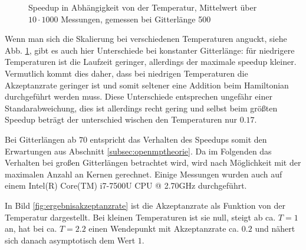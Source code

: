 	
	\begin{figure}[htbp]
		
		\caption[Speedup in Abhängigkeit von der Temperatur]{Speedup in Abhängigkeit von der Temperatur, Mittelwert über $10 \cdot 1000$ Messungen, gemessen bei Gitterlänge 500}
		\label{fig:skalierungtemp}
	\end{figure}
		
	Wenn man sich die Skalierung bei verschiedenen Temperaturen anguckt, siehe Abb. \ref{fig:skalierungtemp}, gibt es auch hier Unterschiede bei konstanter Gitterlänge: für niedrigere Temperaturen ist die Laufzeit geringer, allerdings der maximale speedup kleiner. Vermutlich kommt dies daher, dass bei niedrigen Temperaturen die Akzeptanzrate geringer ist und somit seltener eine Addition beim Hamiltonian durchgeführt werden muss. Diese Unterschiede entsprechen ungefähr einer Standarabweichung, dies ist allerdings recht gering und selbst beim größten Speedup beträgt der unterschied wischen den Temperaturen nur $\num{0,17}$.
	
	Bei Gitterlängen ab $70$ entspricht das Verhalten des Speedups somit den Erwartungen aus Abschnitt \ref{subsec:openmptheorie}. Da im Folgenden das Verhalten bei großen Gitterlängen betrachtet wird, wird nach Möglichkeit mit der maximalen Anzahl an Kernen gerechnet. Einige Messungen wurden auch auf einem Intel(R) Core(TM) i7-7500U CPU @ 2.70GHz durchgeführt.
	
	
	
	In Bild \ref{fig:ergebnisakzeptanzrate} ist die Akzeptanzrate als Funktion von der Temperatur dargestellt. Bei kleinen Temperaturen ist sie null, steigt ab ca. $T=1$ an, hat bei ca. $T=\num{2,2}$ einen Wendepunkt mit Akzeptanzrate ca. $\num{0,2}$ und nähert sich danach asymptotisch dem Wert $1$.
	
